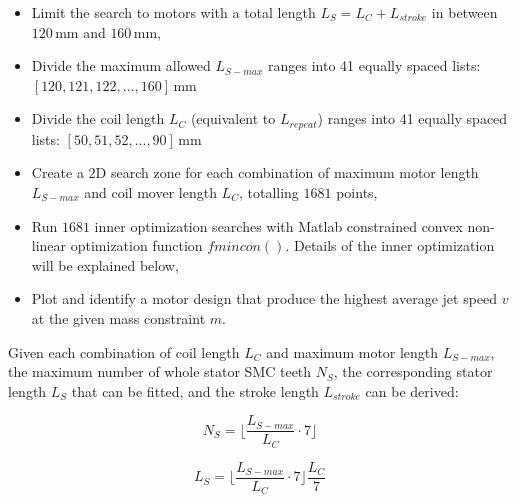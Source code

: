                 
                \begin{itemize}
                    \item   Limit the search to motors with a total length $L_S = L_{C} + L_{stroke}$ in between $120\,\mathrm{mm}$ and $160\,\mathrm{mm}$,
                    \item   Divide the maximum allowed $L_{S-max}$ ranges into 41 equally spaced lists: \\ $[120, 121, 122, ..., 160]\,\mathrm{mm}$ 
                    \item   Divide the coil length $L_{C}$ (equivalent to $L_{repeat}$) ranges into 41 equally spaced lists:  $[50, 51, 52, ..., 90]\,\mathrm{mm}$ 
                    \item   Create a $\mathrm{2D}$ search zone for each combination of maximum motor length $L_{S-max}$ and coil mover length $L_{C}$, totalling $1681$ points,
                    \item   Run $1681$ inner optimization searches with Matlab constrained convex non-linear optimization function $fmincon()$. Details of the inner optimization will be explained below,
                    \item   Plot and identify a motor design that produce the highest average jet speed $v$ at the given mass constraint $m$.
                \end{itemize}
                
                
                
                Given each combination of coil length $L_{C}$ and maximum motor length $L_{S-max}$, the maximum number of whole stator \acs{SMC} teeth $N_S$, the corresponding stator length $L_S$ that can be fitted, and the stroke length $L_{stroke}$ can be derived:


                \begin{equation}
                    N_S = \bigg\lfloor  \frac{L_{S-max}}{L_C} \cdot 7 \bigg\rfloor
                    \label{eq:max mumber of teeth for LFSM stator}
                \end{equation}
                
                
                \begin{equation}
                    L_S = {\bigg\lfloor  \frac{L_{S-max}}{L_C} \cdot 7 \bigg\rfloor} \frac{L_C}{7}
                    \label{eq:possible stator length LFSM stator}
                \end{equation}
                
